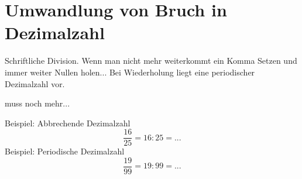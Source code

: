 \section{Umwandlung von Bruch in Dezimalzahl}\vspace{-1em}
Schriftliche Division. Wenn man nicht mehr weiterkommt ein Komma Setzen und immer weiter Nullen holen... Bei Wiederholung liegt eine periodischer Dezimalzahl vor.

muss noch mehr... 

Beispiel: Abbrechende Dezimalzahl
\begin{equation*}
	\frac{16}{25}= 16:25 = ...
\end{equation*}
Beispiel: Periodische Dezimalzahl
\begin{equation*}
	\frac{19}{99}=19:99 = ...
\end{equation*}